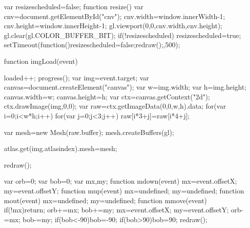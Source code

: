             var resizescheduled=false;
            function resize(){
                var cnv=document.getElementById("cnv");
                cnv.width=window.innerWidth-1;
                cnv.height=window.innerHeight-1;
                gl.viewport(0,0,cnv.width,cnv.height);
                gl.clear(gl.COLOR_BUFFER_BIT);
                if(!resizescheduled){
                    resizescheduled=true;
                    setTimeout(function(){resizescheduled=false;redraw();},500);
                }
            }
            
            function imgLoad(event){
                loaded++;
                progress();
                var img=event.target;
                var canvas=document.createElement("canvas");
                var w=img.width;
                var h=img.height;
                canvas.width=w;
                canvas.height=h;
                var ctx=canvas.getContext("2d");
                ctx.drawImage(img,0,0);
                var raw=ctx.getImageData(0,0,w,h).data;
                for(var i=0;i<w*h;i++){
                    for(var j=0;j<3;j++)
                        raw[i*3+j]=raw[i*4+j];
                }
                
                var mesh=new Mesh(raw.buffer);
                mesh.createBuffers(gl);
                
                atlas.get(img.atlasindex).mesh=mesh;

                redraw();
            }

            var orb=0;
            var bob=0;
            var mx,my;
            function mdown(event){
                mx=event.offsetX;
                my=event.offsetY;
            }
            function mup(event){
                mx=undefined;
                my=undefined;
            }
            function mout(event){
                mx=undefined;
                my=undefined;
            }
            function mmove(event){
                if(!mx)return;
                orb+=mx;
                bob+=my;
                mx=event.offsetX;
                my=event.offsetY;
                orb-=mx;
                bob-=my;
                if(bob<-90)bob=-90;
                if(bob>90)bob=90;
                redraw();
            }
            
